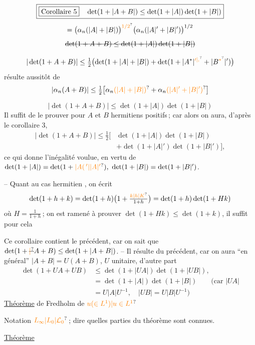 \[
\boxed{\text{\fbox{Corollaire 5}}\quad\det(1+|A+B|)\leq\det(1+|A|)\det(1+|B|)}
\]
\[
=\bigl(\alpha_n(|A|+|B|)\bigr)^{\unsure{1/2}}\bigl(\alpha_n(|A|'+|B|')\bigr)^{1/2}
\]
\[
\deleted{\det(1+A+B)\leq\det(1+|A|)\det(1+|B|)}
\]

\[
|\det(1+A+B)|\leq\tfrac12\bigl(\det(1+|A|+|B|)+\det(1+|A^*|^{\unsure{\prime|,}}+|B^{\unsure{*}}|')\bigr)
\]
résulte aussitôt de
\[
|\alpha_n(A+B)|\leq\tfrac12\bigl[\alpha_n\unsure{(|A|+|B|)}+\alpha_n\unsure{(|A|'+|B|')}\bigr]
\]

\[
\boxed{|\det(1+A+B)|\leq\det(1+|A|)\det(1+|B|)}
\]
Il suffit de  le prouver pour $A$ et $B$
hermitiens positifs\,; car alors on aura, d'après
le corollaire 3,
\[
\begin{aligned}
|\det(1+A+B)|\leq\tfrac12\bigl[&\det(1+|A|)\det(1+|B|)\\
&+\det(1+|A|')\det(1+|B|')\bigr],
\end{aligned}
\]
ce qui donne l'inégalité voulue, en vertu de
$\det(1+|A|)=\det(1+\unsure{\lvert A(\,{}'|\lvert A\rvert'}),\ \det(1+|B|)=\det(1+|B|')$.

-- Quant au cas hermitien , on écrit
\[
\det(1+h+k)=\det(1+h)\bigl(1+\tfrac{\unsure{k|h|K}}{1+h}\bigr)=\det(1+h)\det(1+Hk)
\]
où $H=\frac{1}{1+h}$\,; on est ramené à prouver
$\det(1+Hk)\leq\det(1+k)$, il suffit pour cela

Ce corollaire contient le précédent, car on sait
que $\det(1+\deleted{\unsure{|}}A+B)\leq\det(1+|A+B|)$. -- Il
résulte du précédent, car on aura ``en général''
$|A+B|=U(A+B)$, $U$ unitaire, d'autre part
\[
\begin{aligned}
\det(1+UA+UB)&\leq\det(1+|UA|)\det(1+|UB|),\\
&=\det(1+|A|)\det(1+|B|)\qquad(\text{car } |UA|\\
&=U|A|U^{-1},\quad |UB|=U|B|U^{-1})
\end{aligned}
\]
\uline{Théorème}  de Fredholm de $\unsure{u(\in L^1)|u\in L^1}$ 

Notation $\unsure{L_\infty|L_0|\mathcal L_0}$\,; dire   quelles
parties du  théorème \unsure{--} sont connues.

\uline{Théorème}

